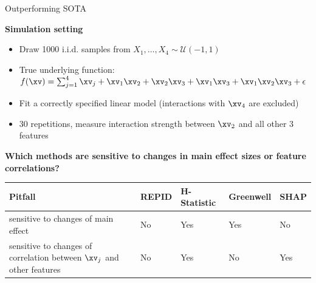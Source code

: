     \begin{frame}{Outperforming SOTA}
    
    \textbf{Simulation setting}
    \begin{itemize}
        \item Draw 1000 i.i.d. samples from $X_1, \ldots , X_4 \sim \mathcal{U}(-1,1)$
        \item True underlying function: $f(\xv) = \sum\nolimits_{j=1}^4 \xv_j + \xv_1 \xv_2 + \xv_2 \xv_3 + \xv_1 \xv_3 + \xv_1 \xv_2 \xv_3 + \epsilon$ %
        \item Fit a correctly specified linear model (interactions with $\xv_4$ are excluded)
        \item 30 repetitions, measure interaction strength between $\xv_2$ and all other 3 features
    \end{itemize}
    
    \textbf{Which methods are sensitive to changes in main effect sizes or feature correlations?}
    
    
        \begin{table}[thb]
    \vspace{.1in}
        \label{tab:simSummary}
        \begin{center}
        \begin{tabular}{|p{5.4cm}|p{1.6cm}|p{1.8cm}|p{1.6cm}|p{1.6cm}|}
        \hline
           Pitfall & REPID & H-Statistic & Greenwell & SHAP  \\\hline
           sensitive to changes of main effect & No & Yes & Yes & No\\\hline
           sensitive to changes of correlation between $\xv_j$ and other features & No & Yes & No & Yes\\
      \hline
        \end{tabular}
        \end{center}
    \end{table}
    \vspace*{0.2cm}
    
    
    
    
    \end{frame}
    
